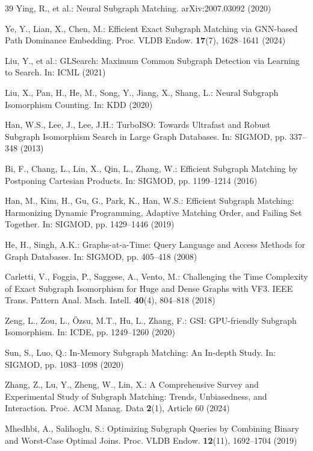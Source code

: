 \documentclass[runningheads]{llncs}
\begin{document}
\begin{thebibliography}{39}
Ying, R., et al.: Neural Subgraph Matching. arXiv:2007.03092 (2020)

Ye, Y., Lian, X., Chen, M.: Efficient Exact Subgraph Matching via GNN-based Path Dominance Embedding. Proc. VLDB Endow. \textbf{17}(7), 1628--1641 (2024)

Liu, Y., et al.: GLSearch: Maximum Common Subgraph Detection via Learning to Search. In: ICML (2021)

Liu, X., Pan, H., He, M., Song, Y., Jiang, X., Shang, L.: Neural Subgraph Isomorphism Counting. In: KDD (2020)

Han, W.S., Lee, J., Lee, J.H.: TurboISO: Towards Ultrafast and Robust Subgraph Isomorphism Search in Large Graph Databases. In: SIGMOD, pp. 337--348 (2013)

Bi, F., Chang, L., Lin, X., Qin, L., Zhang, W.: Efficient Subgraph Matching by Postponing Cartesian Products. In: SIGMOD, pp. 1199--1214 (2016)

Han, M., Kim, H., Gu, G., Park, K., Han, W.S.: Efficient Subgraph Matching: Harmonizing Dynamic Programming, Adaptive Matching Order, and Failing Set Together. In: SIGMOD, pp. 1429--1446 (2019)

He, H., Singh, A.K.: Graphs-at-a-Time: Query Language and Access Methods for Graph Databases. In: SIGMOD, pp. 405--418 (2008)

Carletti, V., Foggia, P., Saggese, A., Vento, M.: Challenging the Time Complexity of Exact Subgraph Isomorphism for Huge and Dense Graphs with VF3. IEEE Trans. Pattern Anal. Mach. Intell. \textbf{40}(4), 804--818 (2018)

Zeng, L., Zou, L., \"{O}zsu, M.T., Hu, L., Zhang, F.: GSI: GPU-friendly Subgraph Isomorphism. In: ICDE, pp. 1249--1260 (2020)

Sun, S., Luo, Q.: In-Memory Subgraph Matching: An In-depth Study. In: SIGMOD, pp. 1083--1098 (2020)

Zhang, Z., Lu, Y., Zheng, W., Lin, X.: A Comprehensive Survey and Experimental Study of Subgraph Matching: Trends, Unbiasedness, and Interaction. Proc. ACM Manag. Data \textbf{2}(1), Article 60 (2024)

Mhedhbi, A., Salihoglu, S.: Optimizing Subgraph Queries by Combining Binary and Worst-Case Optimal Joins. Proc. VLDB Endow. \textbf{12}(11), 1692--1704 (2019)


\end{thebibliography}
\end{document}
